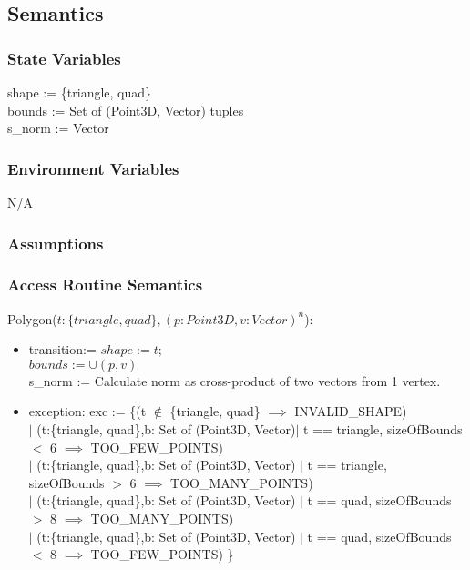 \documentclass[12pt, titlepage]{article}
\begin{document}
\subsection{Semantics}
\subsubsection{State Variables}
shape := \{triangle, quad\}\\
bounds := Set of (Point3D, Vector) tuples\\
s\_norm := Vector\\

\subsubsection{Environment Variables}
N/A

\subsubsection{Assumptions}

\subsubsection{Access Routine Semantics}
\noindent Polygon($t:\{triangle, quad\}, (p:Point3D, v:Vector)^n$):
\begin{itemize}
	\item transition:= $shape := t;$ \\
	$bounds := \cup (p,v)$ \\
	s\_norm := Calculate norm as cross-product of two vectors from 1 vertex.
	\item exception: exc := \{(t $\notin$ \{triangle, quad\} $\implies$ 
	INVALID\_SHAPE) \\ $|$ (t:\{triangle, quad\},b: Set of (Point3D, Vector)$|$ 
	t == triangle, sizeOfBounds $<$ 6 $\implies$ TOO\_FEW\_POINTS) \\ $|$ 
	(t:\{triangle, quad\},b: Set of (Point3D, Vector) $|$ t == triangle, 
	sizeOfBounds $>$ 6 $\implies$ TOO\_MANY\_POINTS) \\ $|$ 
	(t:\{triangle, quad\},b: Set of (Point3D, Vector) $|$ t == quad, 
	sizeOfBounds $>$ 8 $\implies$ TOO\_MANY\_POINTS) \\ $|$ 
	(t:\{triangle, quad\},b: Set of (Point3D, Vector) $|$ t == quad, 
	sizeOfBounds $<$ 8 $\implies$ TOO\_FEW\_POINTS)  \}\\
\end{itemize}
\end{document}
